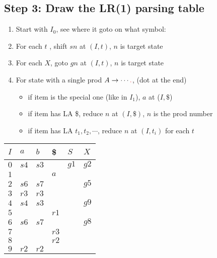 \documentclass[10pt,a4paper,landscape]{article}
\begin{document}
\begin{multicols*}{3}
\section*{Step 3: Draw the LR(1) parsing table}
\begin{enumerate}
\item Start with $I_0$, see where it goto on what symbol:
\item For each  $t$ , shift $sn$ at $(I,t)$,  $n$ is target state
\item For each  $X$, goto $gn$ at $(I,t)$, $n$ is target state
\item For state with a single prod $A\to \cdots \lrd$, (dot at the end)
  \begin{itemize}
  \item if item is the special one (like in $I_1$), $a$ at ($I, \$$)
  \item if item has LA \$, reduce $n$ at $(I, \$)$, $n$ is the prod number
  \item if item has LA $t_1,t_2,\cdots$, reduce $n$ at $(I, t_i)$ for each $t$
  \end{itemize}
\end{enumerate}
\begin{tabular}{l|lll|ll}
  $I$ & $a$  & $b$  & \$  & $S$  & $X$ \\
  \hline
  $0$ & $s4$ & $s3$ &     & $g1$ & $g2$ \\
  $1$ &      &      & $a$ &      &      \\
  $2$ & $s6$ & $s7$ &     &      & $g5$ \\
  $3$ & $r3$ & $r3$ &   &   &  \\
  $4$ & $s4$  & $s3$  &   &   & $g9$ \\
  $5$ &   &   & $r1$  &   &  \\
  $6$ & $s6$  & $s7$  &   &   & $g8$ \\
  $7$ &   &   & $r3$  &   &  \\
  $8$ &   &   & $r2$  &   &  \\
  $9$ & $r2$  & $r2$   & &   &  \\
\end{tabular}
\end{multicols*}
\end{document}
